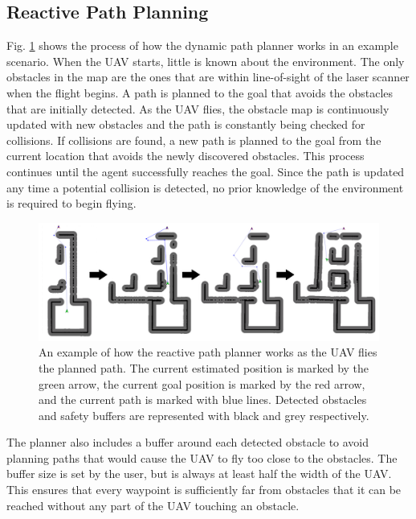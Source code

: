 \documentclass[letterpaper, 10 pt, conference]{ieeeconf}  %
\begin{document}
\subsection{Reactive Path Planning}

Fig. \ref{fig:reactive_plan} shows the process of how the dynamic path planner works in an example scenario. When the UAV starts, little is known about the environment. The only obstacles in the map are the ones that are within line-of-sight of the laser scanner when the flight begins. A path is planned to the goal that avoids the obstacles that are initially detected. As the UAV flies, the obstacle map is continuously updated with new obstacles and the path is constantly being checked for collisions. If collisions are found, a new path is planned to the goal from the current location that avoids the newly discovered obstacles. This process continues until the agent successfully reaches the goal. Since the path is updated any time a potential collision is detected, no prior knowledge of the environment is required to begin flying.

\begin{figure}
\centering
\includegraphics[width=1.0\linewidth]{adaptive_path_plan2.png}
\caption[An example of how the reactive path planner works.]{An example of how the reactive path planner works as the UAV flies the planned path. The current estimated position is marked by the green arrow, the current goal position is marked by the red arrow, and the current path is marked with blue lines. Detected obstacles and safety buffers are represented with black and grey respectively.}
\label{fig:reactive_plan}
\end{figure}

The planner also includes a buffer around each detected obstacle to avoid planning paths that would cause the UAV to fly too close to the obstacles. The buffer size is set by the user, but is always at least half the width of the UAV. This ensures that every waypoint is sufficiently far from obstacles that it can be reached without any part of the UAV touching an obstacle.
\end{document}
